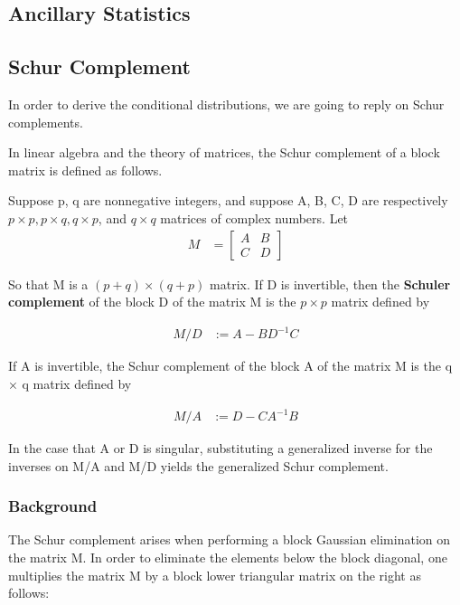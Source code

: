 \documentclass[11pt]{article} %
\begin{document}
\subsection{Ancillary Statistics}






\subsection{Schur Complement}
In order to derive the conditional distributions, we are going to reply on Schur complements. 

In linear algebra and the theory of matrices, the Schur complement of a block matrix is defined as follows.

Suppose p, q are nonnegative integers, and suppose A, B, C, D are respectively $p \times p, p \times q, q \times p$, and $q \times q$ matrices of complex numbers. Let
\begin{align*}
M &= \begin{bmatrix}
	A & B \\
	C & D
\end{bmatrix}
\end{align*}

So that M is a $(p+q) \times (q + p)$ matrix. If D is invertible, then the \textbf{ Schuler complement
} of the block D of the matrix M is the $p \times p$ matrix defined by 

\begin{align*}
	M/D &:= A - B D^{-1} C
\end{align*}

If A is invertible, the Schur complement of the block A of the matrix M is the q × q matrix defined by

\begin{align*}
	M/A &:= D - C A^{-1} B
\end{align*}

In the case that A or D is singular, substituting a generalized inverse for the inverses on M/A and M/D yields the generalized Schur complement.

\subsubsection{Background}

The Schur complement arises when performing a block Gaussian elimination on the matrix M. In order to eliminate the elements below the block diagonal, one multiplies the matrix M by a block lower triangular matrix on the right as follows:
\end{document}
